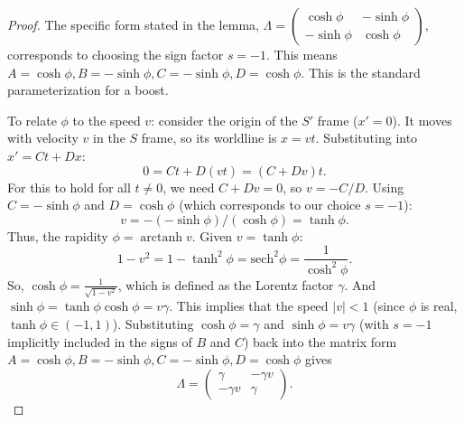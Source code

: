 \documentclass{amsart}
\theoremstyle{definition}
\theoremstyle{remark}
\DeclareMathOperator{\arctanh}{arctanh}
\begin{document}
\begin{proof}
  The specific form stated in the lemma, $\Lambda = \begin{pmatrix} \cosh\phi & -\sinh\phi \\ -\sinh\phi & \cosh\phi \end{pmatrix}$, corresponds to choosing the sign factor $s=-1$.
  This means $A = \cosh\phi, B = -\sinh\phi, C = -\sinh\phi, D = \cosh\phi$. This is the standard parameterization for a boost.

  To relate $\phi$ to the speed $v$: consider the origin of the $S'$ frame ($x'=0$). It moves with velocity $v$ in the $S$ frame, so its worldline is $x=vt$.
  Substituting into $x' = C t + D x$:
  \begin{equation*}
    0 = C t + D (vt) = (C + Dv)t.
  \end{equation*}
  For this to hold for all $t \neq 0$, we need $C+Dv=0$, so $v = -C/D$.
  Using $C = -\sinh\phi$ and $D = \cosh\phi$ (which corresponds to our choice $s=-1$):
  \begin{equation*}
    v = -(-\sinh\phi) / (\cosh\phi) = \tanh\phi.
  \end{equation*}
  Thus, the rapidity $\phi = \arctanh v$.
  Given $v = \tanh\phi$:
  \begin{equation*}
    1 - v^2 = 1 - \tanh^2\phi = \mathrm{sech}^2\phi = \frac{1}{\cosh^2\phi}.
  \end{equation*}
  So, $\cosh\phi = \frac{1}{\sqrt{1-v^2}}$, which is defined as the Lorentz factor $\gamma$.
  And $\sinh\phi = \tanh\phi \cosh\phi = v\gamma$.
  This implies that the speed $|v| < 1$ (since $\phi$ is real, $\tanh\phi \in (-1,1)$).
  Substituting $\cosh\phi = \gamma$ and $\sinh\phi = v\gamma$ (with $s=-1$ implicitly included in the signs of $B$ and $C$) back into the matrix form $A=\cosh\phi, B=-\sinh\phi, C=-\sinh\phi, D=\cosh\phi$ gives
  \begin{equation*}
    \Lambda =
    \begin{pmatrix}
      \gamma & -\gamma v \\
      -\gamma v & \gamma
    \end{pmatrix}.
  \end{equation*}
\end{proof}
\end{document}
